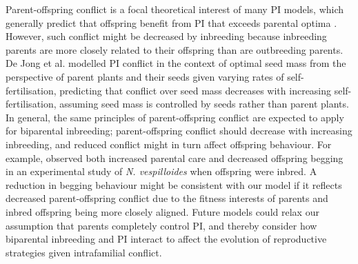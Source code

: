 \documentclass[12pt]{article}
\begin{document}
Parent-offspring conflict is a focal theoretical interest of many PI models, which generally predict that offspring benefit from PI that exceeds parental optima \cite[][]{Macnair1978, Parker1978, Parker1985, DeJong2005}. However, such conflict might be decreased by inbreeding because inbreeding parents are more closely related to their offspring than are outbreeding parents. De Jong et al. \cite{DeJong2005} modelled PI conflict in the context of optimal seed mass from the perspective of parent plants and their seeds given varying rates of self-fertilisation, predicting that conflict over seed mass decreases with increasing self-fertilisation, assuming seed mass is controlled by seeds rather than parent plants. In general, the same principles of parent-offspring conflict are expected to apply for biparental inbreeding; parent-offspring conflict should decrease with increasing inbreeding, and reduced conflict might in turn affect offspring behaviour. For example, \cite{Mattey2014} observed both increased parental care and decreased offspring begging in an experimental study of \textit{N. vespilloides} when offspring were inbred. A reduction in begging behaviour might be consistent with our model if it reflects decreased parent-offspring conflict due to the fitness interests of parents and inbred offspring being more closely aligned. Future models could relax our assumption that parents completely control PI, and thereby consider how biparental inbreeding and PI interact to affect the evolution of reproductive strategies given intrafamilial conflict.
\end{document}
